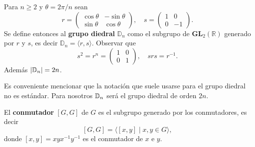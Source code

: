 \begin{example}
	Para $n\geq2$ y $\theta=2\pi/n$ sean  
	\[
		r=\left(\begin{array}{cc}
			\cos\theta & -\sin\theta\\
			\sin\theta & \cos\theta
		\end{array}\right),\quad s=\left(\begin{array}{cc}
			1 & 0\\
			0 & -1
		\end{array}\right).
	\]
	Se define entonces al \textbf{grupo diedral} $\mathbb{D}_{n}$ como el subgrupo
	de $\mathbf{GL}_2(\mathbb{R})$ generado por $r$ y $s$, es decir
	$\mathbb{D}_{n}=\langle r,s\rangle$. Observar que 
	\[
	s^2=r^n=\begin{pmatrix}
	1 & 0\\
	0 & 1	
	\end{pmatrix},\quad
	srs=r^{-1}.
	\]
	Además $|\mathbb{D}_n|=2n$. 
\end{example}

Es conveniente mencionar que la notación que suele usarse para el grupo diedral no es estándar. Para nosotros $\mathbb{D}_n$ será el grupo diedral de orden $2n$. 

\begin{definition}
El \textbf{conmutador}
$[G,G]$ de $G$ es el subgrupo generado por los conmutadores, es
decir 
\[
[G,G]=\langle[x,y]\mid x,y\in G\rangle,
\]	
donde $[x,y]=xyx^{-1}y^{-1}$ es el conmutador de $x$ e $y$. 
\end{definition}

